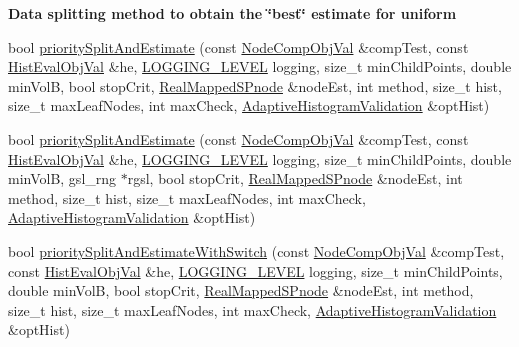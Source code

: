 \begin{Indent}{\bf \-Data splitting method to obtain the \char`\"{}best\char`\"{} estimate for uniform}
\begin{DoxyCompactItemize}
\item 
bool \hyperlink{classsubpavings_1_1AdaptiveHistogramValidation_ae94f662a33afa791de400341ad98cff7}{priority\-Split\-And\-Estimate} (const \hyperlink{classsubpavings_1_1NodeCompObjVal}{\-Node\-Comp\-Obj\-Val} \&comp\-Test, const \hyperlink{classsubpavings_1_1HistEvalObjVal}{\-Hist\-Eval\-Obj\-Val} \&he, \hyperlink{namespacesubpavings_aef8e51096b59ecaf1a1e9b2ee24b6089}{\-L\-O\-G\-G\-I\-N\-G\-\_\-\-L\-E\-V\-E\-L} logging, size\-\_\-t min\-Child\-Points, double min\-Vol\-B, bool stop\-Crit, \hyperlink{classsubpavings_1_1RealMappedSPnode}{\-Real\-Mapped\-S\-Pnode} \&node\-Est, int method, size\-\_\-t hist, size\-\_\-t max\-Leaf\-Nodes, int max\-Check, \hyperlink{classsubpavings_1_1AdaptiveHistogramValidation}{\-Adaptive\-Histogram\-Validation} \&opt\-Hist)
\item 
bool \hyperlink{classsubpavings_1_1AdaptiveHistogramValidation_a831814eaa200ac0fb42b5b600ec785c3}{priority\-Split\-And\-Estimate} (const \hyperlink{classsubpavings_1_1NodeCompObjVal}{\-Node\-Comp\-Obj\-Val} \&comp\-Test, const \hyperlink{classsubpavings_1_1HistEvalObjVal}{\-Hist\-Eval\-Obj\-Val} \&he, \hyperlink{namespacesubpavings_aef8e51096b59ecaf1a1e9b2ee24b6089}{\-L\-O\-G\-G\-I\-N\-G\-\_\-\-L\-E\-V\-E\-L} logging, size\-\_\-t min\-Child\-Points, double min\-Vol\-B, gsl\-\_\-rng $\ast$rgsl, bool stop\-Crit, \hyperlink{classsubpavings_1_1RealMappedSPnode}{\-Real\-Mapped\-S\-Pnode} \&node\-Est, int method, size\-\_\-t hist, size\-\_\-t max\-Leaf\-Nodes, int max\-Check, \hyperlink{classsubpavings_1_1AdaptiveHistogramValidation}{\-Adaptive\-Histogram\-Validation} \&opt\-Hist)
\item 
bool \hyperlink{classsubpavings_1_1AdaptiveHistogramValidation_ae20e1507aad418b0d5aee31882b738ea}{priority\-Split\-And\-Estimate\-With\-Switch} (const \hyperlink{classsubpavings_1_1NodeCompObjVal}{\-Node\-Comp\-Obj\-Val} \&comp\-Test, const \hyperlink{classsubpavings_1_1HistEvalObjVal}{\-Hist\-Eval\-Obj\-Val} \&he, \hyperlink{namespacesubpavings_aef8e51096b59ecaf1a1e9b2ee24b6089}{\-L\-O\-G\-G\-I\-N\-G\-\_\-\-L\-E\-V\-E\-L} logging, size\-\_\-t min\-Child\-Points, double min\-Vol\-B, bool stop\-Crit, \hyperlink{classsubpavings_1_1RealMappedSPnode}{\-Real\-Mapped\-S\-Pnode} \&node\-Est, int method, size\-\_\-t hist, size\-\_\-t max\-Leaf\-Nodes, int max\-Check, \hyperlink{classsubpavings_1_1AdaptiveHistogramValidation}{\-Adaptive\-Histogram\-Validation} \&opt\-Hist)
\item 

\end{DoxyCompactItemize}
\end{Indent}

